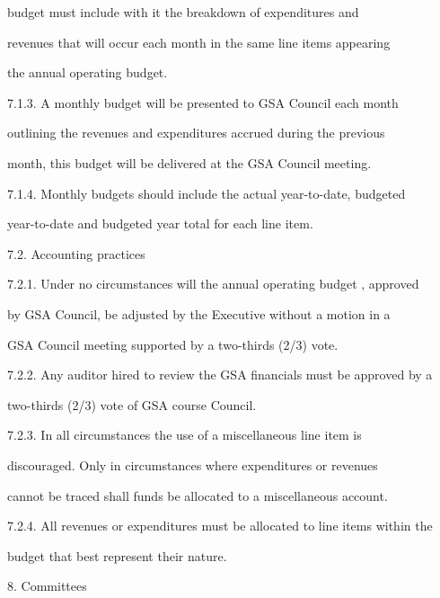         budget  must  include  with  it  the  breakdown  of  expenditures  and  

        revenues that will occur each month in the same line items appearing  

        the annual operating budget.  



7.1.3. A  monthly  budget  will  be  presented  to  GSA  Council  each  month  

        outlining  the  revenues  and  expenditures  accrued  during  the  previous  

        month, this budget will be delivered at the GSA Council meeting.  



7.1.4. Monthly  budgets  should  include  the  actual  year-to-date,  budgeted  

        year-to-date and budgeted year total for each line item.  



7.2.         Accounting practices  



7.2.1. Under  no  circumstances  will  the  annual  operating  budget  ,  approved  

        by GSA Council, be adjusted by the Executive  without a motion in a  

        GSA  Council meeting supported by a two-thirds (2/3) vote.  



7.2.2. Any auditor hired to review the GSA financials must be approved by a  

        two-thirds (2/3) vote of GSA course Council.  



7.2.3. In    all   circumstances       the    use   of   a   miscellaneous        line   item    is  

        discouraged.  Only  in  circumstances  where  expenditures  or  revenues  

        cannot be traced shall funds be allocated to a miscellaneous account.  



7.2.4. All revenues or expenditures must be allocated to line items within the  

        budget that best represent their nature.  



  



8.  Committees  



